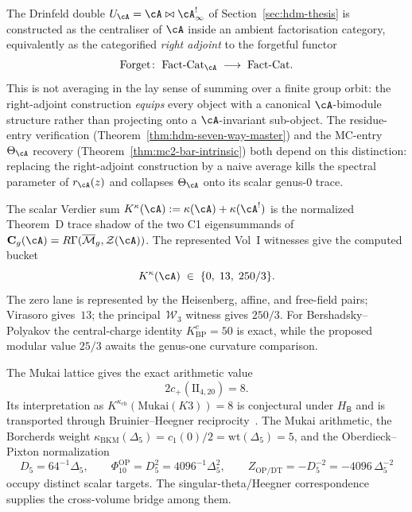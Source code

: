 \begin{remark}
\label{rem:hdm-ap-cy54-discipline}

The Drinfeld double $U_\cA = \cA \bowtie \cA^{!}_\infty$ of
Section~\ref{sec:hdm-thesis} is constructed as the centraliser of
$\cA$ inside an ambient factorisation category, equivalently as
the categorified \emph{right adjoint} to the forgetful functor
\[
 \mathrm{Forget}\colon\;
 \mathrm{Fact}\text{-}\mathrm{Cat}_\cA \;\longrightarrow\;
 \mathrm{Fact}\text{-}\mathrm{Cat}.
\]
This is not averaging in the lay sense of summing over a finite
group orbit: the right-adjoint construction
\emph{equips} every object with a canonical $\cA$-bimodule
structure rather than projecting onto a $\cA$-invariant
sub-object. The residue-entry verification
(Theorem~\ref{thm:hdm-seven-way-master}) and the MC-entry
$\Theta_\cA$ recovery
(Theorem~\ref{thm:mc2-bar-intrinsic}) both depend on this
distinction: replacing the right-adjoint construction by a naive
average kills the spectral parameter of $r_\cA(z)$ and collapses
$\Theta_\cA$ onto its scalar genus-$0$ trace.
\end{remark}

\begin{remark}
\label{rem:holo-master-theoremC-bucket}
The scalar Verdier sum
$K^\kappa(\cA):=\kappa(\cA)+\kappa(\cA^!)$ is the normalized
Theorem~D trace shadow of the two C1 eigensummands of
$\mathbf C_g(\cA)=R\Gamma(\overline{\mathcal M}_g,\mathcal Z(\cA))$.
The represented Vol~I witnesses give the computed bucket
\[
 K^\kappa(\cA)
 \;\in\;
 \{0,\;13,\;250/3\}.
\]
The zero lane is represented by the Heisenberg, affine, and free-field
pairs; Virasoro gives~$13$; the principal~$\mathcal W_3$ witness gives
$250/3$.  For Bershadsky--Polyakov the central-charge identity
$K^c_{\mathrm{BP}}=50$ is exact, while the proposed modular value
$25/3$ awaits the genus-one curvature comparison.

The Mukai lattice gives the exact arithmetic value
\[
 2c_+(\mathrm{II}_{4,20})=8.
\]
Its interpretation as
$K^{\kappa_{\mathrm{ch}}}(\mathrm{Mukai}(K3))=8$ is conjectural under
$H_{\mathsf B}$ and is transported through Bruinier--Heegner
reciprocity~\cite{Bruinier02}.  The Mukai arithmetic, the Borcherds
weight
$\kappa_{\mathrm{BKM}}(\Delta_5)=c_1(0)/2=\mathrm{wt}(\Delta_5)=5$,
and the Oberdieck--Pixton normalization
\[
 D_5=64^{-1}\Delta_5,\qquad
 \Phi_{10}^{\mathrm{OP}}=D_5^2=4096^{-1}\Delta_5^2,\qquad
 Z_{\mathrm{OP/DT}}=-D_5^{-2}=-4096\,\Delta_5^{-2}
\]
occupy distinct scalar targets.  The singular-theta/Heegner
correspondence supplies the cross-volume bridge among them.
\end{remark}


